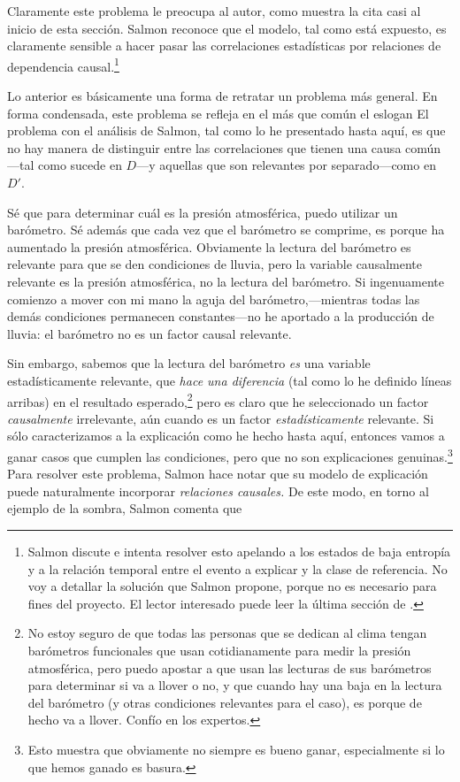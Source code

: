 Claramente este problema le preocupa al autor, como muestra
la cita casi al inicio de esta sección. Salmon reconoce que
el modelo, tal como está expuesto, es claramente sensible a
hacer pasar las correlaciones estadísticas por relaciones
de dependencia causal.\footnote{
  Salmon discute e intenta resolver esto apelando a los
  estados de baja entropía y a la relación temporal entre el
  evento a explicar y la clase de referencia. No voy a
  detallar la solución que Salmon propone,	porque no es
  necesario para fines del proyecto. El lector	interesado
  puede leer la última sección de \parencite{Salmon1970}. 
}

Lo anterior es básicamente una forma de retratar un problema
más general. En forma condensada, este problema se refleja
en el más que común el eslogan  El problema con el análisis de Salmon, tal como
lo he presentado hasta aquí, es que no hay manera de
distinguir entre las correlaciones que tienen una causa
común---tal como sucede en $D$---y aquellas que son
relevantes por separado---como en $D'$. 

Sé que para determinar cuál es la presión atmosférica, puedo
utilizar un barómetro. Sé además que cada vez que el
barómetro se comprime, es porque ha aumentado la presión
atmosférica. Obviamente la lectura del barómetro es
relevante para que se den condiciones de lluvia, pero la
variable causalmente relevante es la presión atmosférica, no
la lectura del barómetro. Si ingenuamente comienzo a mover
con mi mano la aguja del barómetro,---mientras todas las
demás condiciones permanecen constantes---no
he aportado a la producción de lluvia: el barómetro no es un
factor causal relevante.

Sin embargo, sabemos que la lectura del barómetro \emph{es}
una variable estadísticamente relevante, que \emph{hace una
diferencia} (tal como lo he definido líneas arribas) en el
resultado esperado,\footnote{
  No estoy seguro de que todas las personas que se dedican
  al clima tengan barómetros funcionales que usan
  cotidianamente para medir la presión atmosférica, pero
  puedo	apostar a que usan las lecturas de sus barómetros
  para determinar si va a llover o no, y que cuando hay una
  baja en la lectura del barómetro (y otras condiciones
  relevantes para el caso), es porque de	hecho va a llover.
  Confío en los expertos. 
}
pero es claro que he seleccionado un factor
\emph{causalmente} irrelevante, aún cuando es un factor
\emph{estadísticamente} relevante. Si sólo caracterizamos a
la explicación como he hecho hasta aquí, entonces vamos a
ganar casos que cumplen las condiciones, pero que no son
explicaciones genuinas.\footnote{
	Esto muestra que obviamente no siempre es bueno ganar,
	especialmente si lo que hemos ganado es basura.
} 
Para resolver este problema, Salmon hace notar que su modelo
de explicación puede naturalmente incorporar
\emph{relaciones causales.} De este modo, en torno al
ejemplo de la sombra, Salmon comenta que

